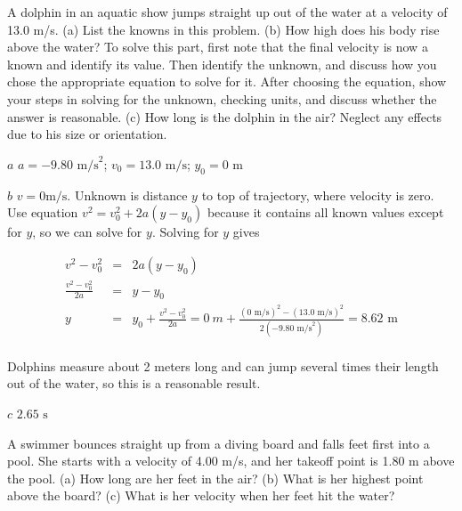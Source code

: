 \documentclass[
]{book}
\newenvironment{unnumbered}{}{}
\newenvironment{problems-exercises}{}{}
\begin{document}
\begin{problems-exercises}
\hypertarget{fs-id1788413}{}
\leavevmode\hypertarget{fs-id1757046}{}%
A dolphin in an aquatic show jumps straight up out of the water at a
velocity of 13.0 m/s. (a) List the knowns in this problem. (b) How high
does his body rise above the water? To solve this part, first note that
the final velocity is now a known and identify its value. Then identify
the unknown, and discuss how you chose the appropriate equation to solve
for it. After choosing the equation, show your steps in solving for the
unknown, checking units, and discuss whether the answer is reasonable.
(c) How long is the dolphin in the air? Neglect any effects due to his
size or orientation.

\leavevmode\hypertarget{fs-id1722491}{}%
\(a\) \({{a = {- 9}}\text{.}\text{80\ m/s}^{2}}{}\);
\({{v_{0} = \text{13}}\text{.}\text{0\ m/s}}{}\);
\({y_{0} = \text{0\ m}}{}\)

\(b\) \({{v = 0}\text{m/s}}{}\). Unknown is distance \(y{}\) to top of
trajectory, where velocity is zero. Use equation
\({{v^{2} = {v_{0}^{2} + 2a}}\left( {y - y_{0}} \right)}{}\) because it
contains all known values except for \(y{}\), so we can solve for \(y{}\).
Solving for \(y{}\) gives

\hypertarget{eip-id2418613}{}
\begin{unnumbered}

\[\begin{array}{lll}
{v^{2} - v_{0}^{2}} & = & {2a\left( {y - y_{0}} \right)} \\
\frac{v^{2} - v_{0}^{2}}{2a} & = & {y - y_{0}} \\
y & = & {{{{y_{0} + \frac{v^{2} - v_{0}^{2}}{2a}} = 0\ m + \frac{\left( \text{0\ m/s} \right)^{2} - \left( \text{13.0\ m/s} \right)^{2}}{2\left( {- \text{9.80\ m}\text{/s}^{2}} \right)}} =}\text{8.62\ m}} \\
\end{array}\]

\end{unnumbered}

Dolphins measure about 2 meters long and can jump several times their
length out of the water, so this is a reasonable result.

\(c\) \({2\text{.}\text{65\ s}}{}\)

\hypertarget{fs-id1818111}{}
\leavevmode\hypertarget{fs-id1758954}{}%
A swimmer bounces straight up from a diving board and falls feet first
into a pool. She starts with a velocity of 4.00 m/s, and her takeoff
point is 1.80 m above the pool. (a) How long are her feet in the air?
(b) What is her highest point above the board? (c) What is her velocity
when her feet hit the water?


\end{problems-exercises}
\end{document}
